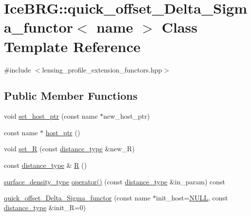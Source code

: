 \hypertarget{classIceBRG_1_1quick__offset__Delta__Sigma__functor}{\section{Ice\-B\-R\-G\-:\-:quick\-\_\-offset\-\_\-\-Delta\-\_\-\-Sigma\-\_\-functor$<$ name $>$ Class Template Reference}
\label{classIceBRG_1_1quick__offset__Delta__Sigma__functor}
}


{\ttfamily \#include $<$lensing\-\_\-profile\-\_\-extension\-\_\-functors.\-hpp$>$}

\subsection*{Public Member Functions}
\begin{DoxyCompactItemize}
\item 
void \hyperlink{classIceBRG_1_1quick__offset__Delta__Sigma__functor_a6c97e4d59bd72c17832b61c1e0a0f479}{set\-\_\-host\-\_\-ptr} (const name $\ast$new\-\_\-host\-\_\-ptr)
\item 
const name $\ast$ \hyperlink{classIceBRG_1_1quick__offset__Delta__Sigma__functor_a275512b6a0658f46d991980bbeeff19a}{host\-\_\-ptr} ()
\item 
void \hyperlink{classIceBRG_1_1quick__offset__Delta__Sigma__functor_a51d8eeecf5157f37a62b8af405447761}{set\-\_\-\-R} (const \hyperlink{namespaceIceBRG_a45499647eb87e24c10ab32c628711cec}{distance\-\_\-type} \&new\-\_\-\-R)
\item 
const \hyperlink{namespaceIceBRG_a45499647eb87e24c10ab32c628711cec}{distance\-\_\-type} \& \hyperlink{classIceBRG_1_1quick__offset__Delta__Sigma__functor_a238622d50e2ca51b3677884da90ce6ae}{R} ()
\item 
\hyperlink{namespaceIceBRG_a80c597ef5ba0a32491d32a9f0083b02d}{surface\-\_\-density\-\_\-type} \hyperlink{classIceBRG_1_1quick__offset__Delta__Sigma__functor_a335cbed4b8b11e1a776e9303b7702977}{operator()} (const \hyperlink{namespaceIceBRG_a45499647eb87e24c10ab32c628711cec}{distance\-\_\-type} \&in\-\_\-param) const 
\item 
\hyperlink{classIceBRG_1_1quick__offset__Delta__Sigma__functor_a54ef5555c330fcdeaca4f6e1446f92ac}{quick\-\_\-offset\-\_\-\-Delta\-\_\-\-Sigma\-\_\-functor} (const name $\ast$init\-\_\-host=\hyperlink{lib_2IceBRG__main_2common_8h_a070d2ce7b6bb7e5c05602aa8c308d0c4}{N\-U\-L\-L}, const \hyperlink{namespaceIceBRG_a45499647eb87e24c10ab32c628711cec}{distance\-\_\-type} \&init\-\_\-\-R=0)
\end{DoxyCompactItemize}


